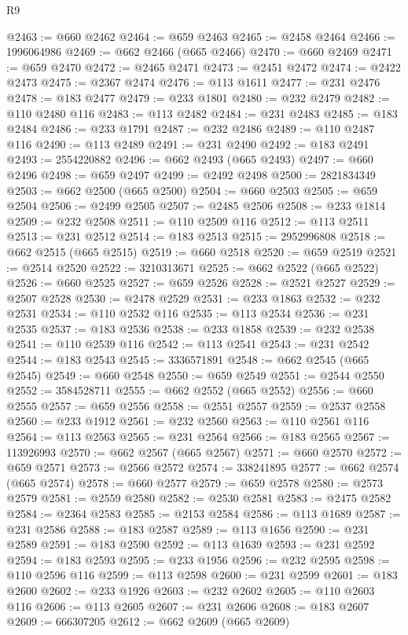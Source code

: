 \begin{lexlean}{R9}
\begin{coremodule}
@2463 := @660 @2462
@2464 := @659 @2463
@2465 := @2458 @2464
@2466 := 1996064986
@2469 := @662 @2466 (@665 @2466)
@2470 := @660 @2469
@2471 := @659 @2470
@2472 := @2465 @2471
@2473 := @2451 @2472
@2474 := @2422 @2473
@2475 := @2367 @2474
@2476 := @113 @1611
@2477 := @231 @2476
@2478 := @183 @2477
@2479 := @233 @1801
@2480 := @232 @2479
@2482 := @110 @2480 @116
@2483 := @113 @2482
@2484 := @231 @2483
@2485 := @183 @2484
@2486 := @233 @1791
@2487 := @232 @2486
@2489 := @110 @2487 @116
@2490 := @113 @2489
@2491 := @231 @2490
@2492 := @183 @2491
@2493 := 2554220882
@2496 := @662 @2493 (@665 @2493)
@2497 := @660 @2496
@2498 := @659 @2497
@2499 := @2492 @2498
@2500 := 2821834349
@2503 := @662 @2500 (@665 @2500)
@2504 := @660 @2503
@2505 := @659 @2504
@2506 := @2499 @2505
@2507 := @2485 @2506
@2508 := @233 @1814
@2509 := @232 @2508
@2511 := @110 @2509 @116
@2512 := @113 @2511
@2513 := @231 @2512
@2514 := @183 @2513
@2515 := 2952996808
@2518 := @662 @2515 (@665 @2515)
@2519 := @660 @2518
@2520 := @659 @2519
@2521 := @2514 @2520
@2522 := 3210313671
@2525 := @662 @2522 (@665 @2522)
@2526 := @660 @2525
@2527 := @659 @2526
@2528 := @2521 @2527
@2529 := @2507 @2528
@2530 := @2478 @2529
@2531 := @233 @1863
@2532 := @232 @2531
@2534 := @110 @2532 @116
@2535 := @113 @2534
@2536 := @231 @2535
@2537 := @183 @2536
@2538 := @233 @1858
@2539 := @232 @2538
@2541 := @110 @2539 @116
@2542 := @113 @2541
@2543 := @231 @2542
@2544 := @183 @2543
@2545 := 3336571891
@2548 := @662 @2545 (@665 @2545)
@2549 := @660 @2548
@2550 := @659 @2549
@2551 := @2544 @2550
@2552 := 3584528711
@2555 := @662 @2552 (@665 @2552)
@2556 := @660 @2555
@2557 := @659 @2556
@2558 := @2551 @2557
@2559 := @2537 @2558
@2560 := @233 @1912
@2561 := @232 @2560
@2563 := @110 @2561 @116
@2564 := @113 @2563
@2565 := @231 @2564
@2566 := @183 @2565
@2567 := 113926993
@2570 := @662 @2567 (@665 @2567)
@2571 := @660 @2570
@2572 := @659 @2571
@2573 := @2566 @2572
@2574 := 338241895
@2577 := @662 @2574 (@665 @2574)
@2578 := @660 @2577
@2579 := @659 @2578
@2580 := @2573 @2579
@2581 := @2559 @2580
@2582 := @2530 @2581
@2583 := @2475 @2582
@2584 := @2364 @2583
@2585 := @2153 @2584
@2586 := @113 @1689
@2587 := @231 @2586
@2588 := @183 @2587
@2589 := @113 @1656
@2590 := @231 @2589
@2591 := @183 @2590
@2592 := @113 @1639
@2593 := @231 @2592
@2594 := @183 @2593
@2595 := @233 @1956
@2596 := @232 @2595
@2598 := @110 @2596 @116
@2599 := @113 @2598
@2600 := @231 @2599
@2601 := @183 @2600
@2602 := @233 @1926
@2603 := @232 @2602
@2605 := @110 @2603 @116
@2606 := @113 @2605
@2607 := @231 @2606
@2608 := @183 @2607
@2609 := 666307205
@2612 := @662 @2609 (@665 @2609)

\end{coremodule}
\end{lexlean}
